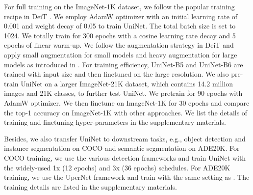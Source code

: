 \documentclass[runningheads]{llncs}
\begin{document}
For full training on the ImageNet-1K dataset, we follow the popular training recipe in DeiT \cite{deit}. We employ AdamW optimizer \cite{adam} with an initial learning rate of 0.001 and weight decay of 0.05 to train UniNet. The total batch size is set to 1024. We totally train for 300 epochs with a cosine learning rate decay and 5 epochs of linear warm-up. We follow the augmentation strategy in DeiT \cite{deit} and apply small augmentation for small models and heavy augmentation for large models as introduced in \cite{cait,trainvit}.
For training efficiency, UniNet-B5 and UniNet-B6 are trained with  input size and then finetuned on the large resolution. 
We also pre-train UniNet on a larger ImageNet-21K dataset, which contains 14.2 million images and 21K classes, to further test UniNet. We pretrain for 90 epochs with AdamW optimizer. We then finetune on ImageNet-1K for 30 epochs and compare the top-1 accuracy on ImageNet-1K with other approaches.
We list the details of training and finetuning hyper-parameters in the supplementary materials.


Besides, we also transfer UniNet to downstream tasks, e.g., object detection and instance segmentation on COCO and semantic segmentation on ADE20K.
For COCO training, we use the various detection frameworks and train UniNet with the widely-used 1x (12 epochs) and 3x (36 epochs) schedules. For ADE20K training, we use the UperNet framework and train with the same setting as \cite{swin}. The training details are listed in the supplementary materials.
\end{document}
